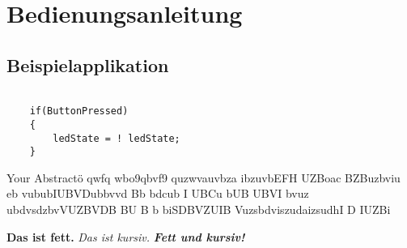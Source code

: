 \documentclass[12pt,a4paper]{article}
\begin{document}
\section{Bedienungsanleitung}
\subsection{Beispielapplikation}
\begin{verbatim}

    if(ButtonPressed)
    {
        ledState = ! ledState;
    }

\end{verbatim}

Your Abstractö qwfq wbo9qbvf9 quzwvauvbza ibzuvbEFH UZBoac BZBuzbviu eb vububIUBVDubbvvd Bb bdcub I UBCu bUB UBVI bvuz ubdvsdzbvVUZBVDB BU B b  biSDBVZUIB VuzsbdviszudaizsudhI D IUZBi


\textbf{Das ist fett.}
\textit{Das ist kursiv.}
\textbf{\textit{Fett und kursiv!}}
\end{document}
